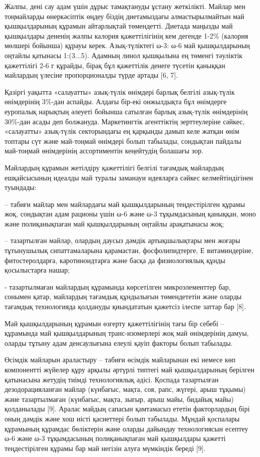 \begin{multicols}{2}
Жалпы, дені сау адам үшін дұрыс тамақтануды ұстану жеткілікті. Майлар
мен тоңмайларды өнеркәсіптік өңдеу біздің диетамыздағы алмастырылмайтын
май қышқылдарының құрамын айтарлықтай төмендетті. Диетада маңызды май
қышқылдары дененің жалпы калория қажеттілігінің кем дегенде 1-2\%
(калория мөлшері бойынша) құрауы керек. Азық-түліктегі ω-3: ω-6 май
қышқылдарының оңтайлы қатынасы 1:(3...5). Адамның линол қышқылына ең
төменгі тәуліктік қажеттілігі 2-6 г құрайды, бірақ бұл қажеттілік денеге
түсетін қаныққан майлардың үлесіне пропорционалды түрде артады {[}6,
7{]}.

Қазіргі уақытта «салауатты» азық-түлік өнімдері барлық белгілі
азық-түлік өнімдерінің 3\%-дан аспайды. Алдағы бір-екі онжылдықта бұл
өнімдерге еуропалық нарықтың әлеуеті бойынша сатылған барлық азық-түлік
өнімдерінің 30\%-дан асады деп болжануда. Маркетингтік агенттіктің
зерттеулеріне сәйкес, «салауатты» азық-түлік секторындағы ең қарқынды
дамып келе жатқан өнім топтары сүт және май-тоңмай өнімдері болып
табылады, сондықтан пайдалы май-тоңмай өнімдерінің ассортиментін
кеңейтудің болашағы зор.

Майлардың құрамын жетілдіру қажеттілігі белгілі тағамдық майлардың
ешқайсысының идеалды май туралы заманауи идеяларға сәйкес
келмейтіндігінен туындады:

-- табиғи майлар мен майлардағы май қышқылдарының теңдестірілген құрамы
жоқ, сондықтан адам рационы үшін ω-6 және ω-3 тұқымдасының қаныққан,
моно және полиқанықпаған май қышқылдарының оңтайлы арақатынасы жоқ;

-- тазартылған майлар, олардың даусыз дәмдік артықшылықтары мен жоғары
тұтынушылық сипаттамаларына қарамастан, фосфолипидтерге, Е
витаминдеріне, фитостеролдарға, каротиноидтарға және басқа да
физиологиялық құнды қосылыстарға нашар;

- тазартылмаған майлардың құрамында көрсетілген микроэлементтер бар,
сонымен қатар, майлардың тағамдық құндылығын төмендететін және оларды
тағамдық технологияда қолдануды қиындататын қажетсіз ілеспе заттар бар
{[}8{]}.

Май қышқылдарының құрамын өзгерту қажеттілігінің тағы бір себебі --
құрамында май қышқылдарының транс-изомерлері жоқ май өнімдерінің дамуы,
оларды тұтыну адам денсаулығына елеулі қауіп факторы болып табылады.

Өсімдік майларын араластыру -- табиғи өсімдік майларынан екі немесе көп
компонентті жүйелер құру арқылы әртүрлі типтегі май қышқылдарының
берілген қатынасына жетудің тиімді технологиялық әдісі. Қоспада
тазартылған дезодорацияланған майлар (күнбағыс, мақта, соя, рапс,
жүгері, арыш тұқымы) және тазартылмаған (күнбағыс, мақта, зығыр, арыш
майы, бидайық майы) қолданылады {[}9{]}. Аралас майдың сапасын
қамтамасыз ететін факторлардың бірі оның дәмдік және хош иісті
қасиеттері болып табылады. Мұндай қоспалары құрамының құрамдас
бөліктерін және оларды дайындау технологиясын есептеу ω-6 және ω-3
тұқымдасының полиқанықпаған май қышқылдары қажетті теңдестірілген құрамы
бар май негізін алуға мүмкіндік береді {[}9{]}.


\end{multicols}
